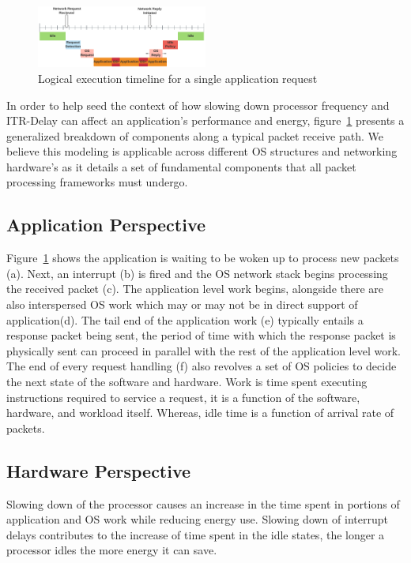 \label{sec:workflow}

\begin{figure}
\centering
\includegraphics[width=0.5\textwidth]{figures/timeline_chart}
\caption[]{Logical execution timeline for a single application request}
\label{fig:timeline}
\end{figure}

In order to help seed the context of how slowing down processor frequency and ITR-Delay can affect an application's performance and energy, figure~\ref{fig:timeline} presents a generalized breakdown of components along a typical packet receive path. We believe this modeling is applicable across different OS structures and networking hardware's as it details a set of fundamental components that all packet processing frameworks must undergo.

\subsection{Application Perspective}
Figure~\ref{fig:timeline} shows the application is waiting to be woken up to process new packets (a). Next, an interrupt (b) is fired and the OS network stack begins processing the received packet (c). The application level work begins, alongside there are also interspersed OS work which may or may not be in direct support of application(d). The tail end of the application work (e) typically entails a response packet being sent, the period of time with which the response packet is physically sent can proceed in parallel with the rest of the application level work. The end of every request handling (f) also revolves a set of OS policies to decide the next state of the software and hardware. Work is time spent executing instructions required to service a request, it is a function of the software, hardware, and workload itself. Whereas, idle time is a function of arrival rate of packets.

\subsection{Hardware Perspective}
Slowing down of the processor causes an increase in the time spent in portions of application and OS work while reducing energy use. Slowing down of interrupt delays contributes to the increase of time spent in the idle states, the longer a processor idles the more energy it can save.

